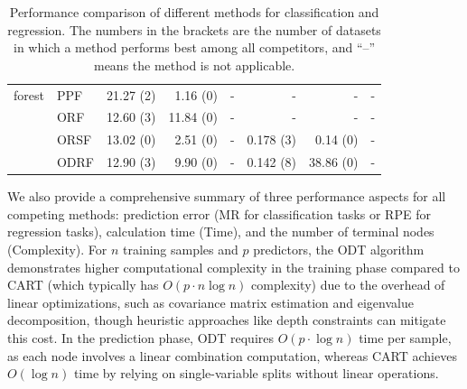 \begin{table}[h!]
\begin{minipage}{\textwidth}
{\begin{tabular}{llrrrrrr}
				forest&PPF   & 21.27 (2)     & 1.16 (0)    & -    & -    & -     & -  \\
				&ORF   & 12.60 (3)     & 11.84 (0)    & -    & -    & -     & -  \\
				&ORSF  & 13.02 (0)     & 2.51 (0)    & -     & 0.178 (3)     & 0.14 (0)     & -  \\
				&ODRF  & 12.90 (3)    & 9.90 (0)    & -     & 0.142 (8)     & 38.86 (0)     & -  \\
				\bottomrule
			\end{tabular}%
		}
	\end{minipage}
	\caption{Performance comparison of different methods for classification and regression.  The numbers in the brackets are  the number of datasets in which a method performs best among all competitors, and ``--'' means the method is not applicable.}
	\label{tab:camp}%
\end{table}%

We also provide a comprehensive summary of three performance aspects for all competing methods: prediction error (MR for classification tasks or RPE for regression tasks), calculation time (Time), and the number of terminal nodes (Complexity). {
For \( n \) training samples and \( p \) predictors, the ODT algorithm demonstrates higher computational complexity in the training phase compared to CART (which typically has \( O(p \cdot n \log n) \) complexity) due to the overhead of linear optimizations, such as covariance matrix estimation and eigenvalue decomposition, though heuristic approaches like depth constraints can mitigate this cost. In the prediction phase, ODT requires \( O(p \cdot \log n) \) time per sample, as each node involves a linear combination computation, whereas CART achieves \( O(\log n) \) time by relying on single-variable splits without linear operations.}

